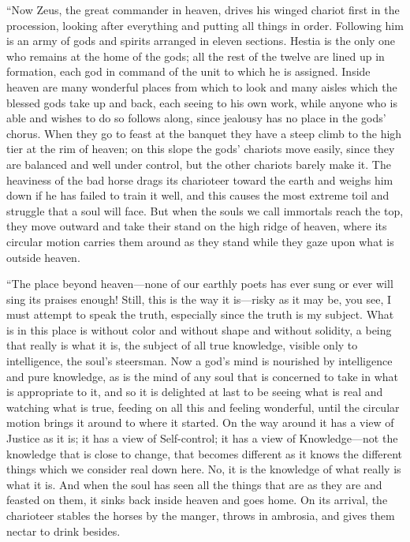 “Now Zeus, the great commander in heaven, drives his winged chariot
first in the procession, looking after everything and putting all things
in order. Following him is an army of gods and spirits arranged in
eleven sections. Hestia is the only one who remains at
the home of the gods; all the rest of the twelve are lined up in
formation, each god in command of the unit to which he is assigned.
Inside heaven are many wonderful places from which to look and many
aisles which the blessed gods take up and back, each seeing to his own
work, while anyone who is able and wishes to do so follows along, since
jealousy has no place in the gods' chorus. When they go to feast at the
banquet they have a steep climb to the high tier at the rim of
heaven; on this slope the gods' chariots move easily, since they are
balanced and well under control, but the other chariots barely make it.
The heaviness of the bad horse drags its charioteer toward the earth and
weighs him down if he has failed to train it well, and this causes the
most extreme toil and struggle that a soul will face. But when the souls
we call immortals reach the top, they move outward and take their stand
on the high ridge of heaven, where its circular motion carries 
them around as they stand while they gaze upon what is outside heaven.

“The place beyond heaven---none of our earthly poets has ever sung or
ever will sing its praises enough! Still, this is the way it is---risky
as it may be, you see, I must attempt to speak the truth, especially
since the truth is my subject. What is in this place is without color
and without shape and without solidity, a being that really is what it
is, the subject of all true knowledge, visible only to intelligence, the
soul's steersman. Now a god's mind is nourished by intelligence
and pure knowledge, as is the mind of any soul that is concerned to take
in what is appropriate to it, and so it is delighted at last to be
seeing what is real and watching what is true, feeding on all this and
feeling wonderful, until the circular motion brings it around to where
it started. On the way around it has a view of Justice as it is; it has
a view of Self-control; it has a view of Knowledge---not the knowledge
that is close to change, that becomes different as it knows the
different things which we consider real down here. No, it is the
knowledge of what really is what it is. And when the soul has
seen all the things that are as they are and feasted on them, it sinks
back inside heaven and goes home. On its arrival, the charioteer stables
the horses by the manger, throws in ambrosia, and gives them nectar to
drink besides.

